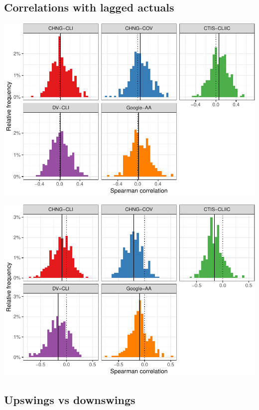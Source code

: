 \documentclass[9pt,twoside,lineno]{pnas-new}
\begin{document}
\hypertarget{correlations-with-lagged-actuals}{%
\subsection{Correlations with lagged
actuals}\label{correlations-with-lagged-actuals}}

\begin{center}\includegraphics[width=\linewidth]{fig/cor-wis-ratio-1} \end{center}

\begin{center}\includegraphics[width=\linewidth]{fig/cor-wis-ratio-m1-1} \end{center}

\hypertarget{upswings-vs-downswings}{%
\subsection{Upswings vs downswings}\label{upswings-vs-downswings}}
\end{document}
